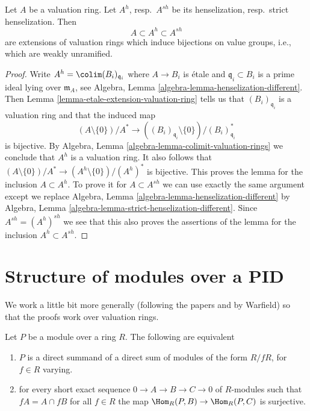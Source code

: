 \begin{lemma}
\label{lemma-henselization-valuation-ring}
Let $A$ be a valuation ring. Let $A^h$, resp.\ $A^{sh}$ be its
henselization, resp.\ strict henselization. Then
$$
A \subset A^h \subset A^{sh}
$$
are extensions of valuation rings which induce bijections on
value groups, i.e., which are weakly unramified.
\end{lemma}

\begin{proof}
Write $A^h = \colim (B_i)_{\mathfrak q_i}$ where $A \to B_i$
is \'etale and $\mathfrak q_i \subset B_i$ is a prime ideal
lying over $\mathfrak m_A$, see
Algebra, Lemma \ref{algebra-lemma-henselization-different}.
Then Lemma \ref{lemma-etale-extension-valuation-ring}
tells us that $(B_i)_{\mathfrak q_i}$
is a valuation ring and that the induced map
$$
(A \setminus \{0\})/A^* \longrightarrow
((B_i)_{\mathfrak q_i} \setminus \{0\}) / (B_i)_{\mathfrak q_i}^*
$$
is bijective. By Algebra, Lemma \ref{algebra-lemma-colimit-valuation-rings}
we conclude that $A^h$ is a valuation ring. It also follows that
$(A \setminus \{0\})/A^* \to (A^h \setminus \{0\})/(A^h)^*$
is bijective. This proves the lemma for the inclusion $A \subset A^h$.
To prove it for $A \subset A^{sh}$ we can use exactly the same argument
except we replace Algebra, Lemma \ref{algebra-lemma-henselization-different} by
Algebra, Lemma \ref{algebra-lemma-strict-henselization-different}.
Since $A^{sh} = (A^h)^{sh}$ we see that this also proves the
assertions of the lemma for the inclusion $A^h \subset A^{sh}$.
\end{proof}










\section{Structure of modules over a PID}
\label{section-structure-modules}

\noindent
We work a little bit more generally (following the papers
\cite{Warfield-Purity} and \cite{Warfield-Decomposition}
by Warfield) so that the proofs work over valuation rings.

\begin{lemma}
\label{lemma-characterize-PD-modules}
\begin{reference}
\cite[Corollary 1]{Warfield-Purity}
\end{reference}
Let $P$ be a module over a ring $R$. The following are equivalent
\begin{enumerate}
\item $P$ is a direct summand of a direct sum of modules of the
form $R/fR$, for $f \in R$ varying.
\item for every short exact sequence $0 \to A \to B \to C \to 0$
of $R$-modules such that $fA = A \cap fB$ for all $f \in R$
the map $\Hom_R(P, B) \to \Hom_R(P, C)$ is surjective.
\end{enumerate}
\end{lemma}

